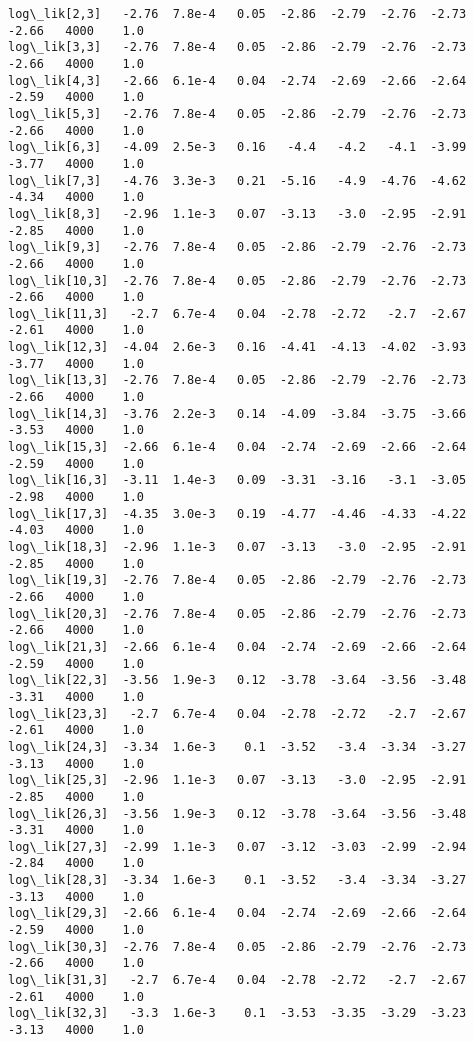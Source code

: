 \documentclass[11pt]{article}
\begin{document}
\begin{Verbatim}[commandchars=\\\{\}]
log\_lik[2,3]   -2.76  7.8e-4   0.05  -2.86  -2.79  -2.76  -2.73  -2.66   4000    1.0
log\_lik[3,3]   -2.76  7.8e-4   0.05  -2.86  -2.79  -2.76  -2.73  -2.66   4000    1.0
log\_lik[4,3]   -2.66  6.1e-4   0.04  -2.74  -2.69  -2.66  -2.64  -2.59   4000    1.0
log\_lik[5,3]   -2.76  7.8e-4   0.05  -2.86  -2.79  -2.76  -2.73  -2.66   4000    1.0
log\_lik[6,3]   -4.09  2.5e-3   0.16   -4.4   -4.2   -4.1  -3.99  -3.77   4000    1.0
log\_lik[7,3]   -4.76  3.3e-3   0.21  -5.16   -4.9  -4.76  -4.62  -4.34   4000    1.0
log\_lik[8,3]   -2.96  1.1e-3   0.07  -3.13   -3.0  -2.95  -2.91  -2.85   4000    1.0
log\_lik[9,3]   -2.76  7.8e-4   0.05  -2.86  -2.79  -2.76  -2.73  -2.66   4000    1.0
log\_lik[10,3]  -2.76  7.8e-4   0.05  -2.86  -2.79  -2.76  -2.73  -2.66   4000    1.0
log\_lik[11,3]   -2.7  6.7e-4   0.04  -2.78  -2.72   -2.7  -2.67  -2.61   4000    1.0
log\_lik[12,3]  -4.04  2.6e-3   0.16  -4.41  -4.13  -4.02  -3.93  -3.77   4000    1.0
log\_lik[13,3]  -2.76  7.8e-4   0.05  -2.86  -2.79  -2.76  -2.73  -2.66   4000    1.0
log\_lik[14,3]  -3.76  2.2e-3   0.14  -4.09  -3.84  -3.75  -3.66  -3.53   4000    1.0
log\_lik[15,3]  -2.66  6.1e-4   0.04  -2.74  -2.69  -2.66  -2.64  -2.59   4000    1.0
log\_lik[16,3]  -3.11  1.4e-3   0.09  -3.31  -3.16   -3.1  -3.05  -2.98   4000    1.0
log\_lik[17,3]  -4.35  3.0e-3   0.19  -4.77  -4.46  -4.33  -4.22  -4.03   4000    1.0
log\_lik[18,3]  -2.96  1.1e-3   0.07  -3.13   -3.0  -2.95  -2.91  -2.85   4000    1.0
log\_lik[19,3]  -2.76  7.8e-4   0.05  -2.86  -2.79  -2.76  -2.73  -2.66   4000    1.0
log\_lik[20,3]  -2.76  7.8e-4   0.05  -2.86  -2.79  -2.76  -2.73  -2.66   4000    1.0
log\_lik[21,3]  -2.66  6.1e-4   0.04  -2.74  -2.69  -2.66  -2.64  -2.59   4000    1.0
log\_lik[22,3]  -3.56  1.9e-3   0.12  -3.78  -3.64  -3.56  -3.48  -3.31   4000    1.0
log\_lik[23,3]   -2.7  6.7e-4   0.04  -2.78  -2.72   -2.7  -2.67  -2.61   4000    1.0
log\_lik[24,3]  -3.34  1.6e-3    0.1  -3.52   -3.4  -3.34  -3.27  -3.13   4000    1.0
log\_lik[25,3]  -2.96  1.1e-3   0.07  -3.13   -3.0  -2.95  -2.91  -2.85   4000    1.0
log\_lik[26,3]  -3.56  1.9e-3   0.12  -3.78  -3.64  -3.56  -3.48  -3.31   4000    1.0
log\_lik[27,3]  -2.99  1.1e-3   0.07  -3.12  -3.03  -2.99  -2.94  -2.84   4000    1.0
log\_lik[28,3]  -3.34  1.6e-3    0.1  -3.52   -3.4  -3.34  -3.27  -3.13   4000    1.0
log\_lik[29,3]  -2.66  6.1e-4   0.04  -2.74  -2.69  -2.66  -2.64  -2.59   4000    1.0
log\_lik[30,3]  -2.76  7.8e-4   0.05  -2.86  -2.79  -2.76  -2.73  -2.66   4000    1.0
log\_lik[31,3]   -2.7  6.7e-4   0.04  -2.78  -2.72   -2.7  -2.67  -2.61   4000    1.0
log\_lik[32,3]   -3.3  1.6e-3    0.1  -3.53  -3.35  -3.29  -3.23  -3.13   4000    1.0

\end{Verbatim}
\end{document}

